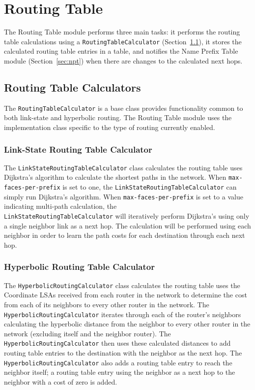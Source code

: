 \section{Routing Table}
\label{sec:routing-table}

The Routing Table module performs three main tasks: it performs the routing table calculations using a \texttt{RoutingTableCalculator} (Section~\ref{sec:routing-table-calculator}),
it stores the calculated routing table entries in a table, and notifies the Name Prefix Table module (Section~\ref{sec:npt}) when there are changes to the calculated next hops.

\subsection{Routing Table Calculators}
\label{sec:routing-table-calculator}

The \texttt{RoutingTableCalculator} is a base class provides functionality common to both link-state and hyperbolic routing.
The Routing Table module uses the implementation class specific to the type of routing currently enabled.

\subsubsection{Link-State Routing Table Calculator}

The \texttt{LinkStateRoutingTableCalculator} class calculates the routing table uses Dijkstra's algorithm to calculate the shortest paths in the network.
When \texttt{max-faces-per-prefix} is set to one, the \texttt{LinkStateRoutingTableCalculator} can simply run Dijkstra's algorithm.
When \texttt{max-faces-per-prefix} is set to a value indicating multi-path calculation, the \\ \texttt{LinkStateRoutingTableCalculator} will iteratively perform Dijkstra's using only a single neighbor link as a next hop.
The calculation will be performed using each neighbor in order to learn the path costs for each destination through each next hop.


\subsubsection{Hyperbolic Routing Table Calculator}

The \texttt{HyperbolicRoutingCalculator} class calculates the routing table uses the Coordinate LSAs received from each router in the network to determine the cost from each of its neighbors to every other router in the network.
The \texttt{HyperbolicRoutingCalculator} iterates through each of the router's neighbors calculating the hyperbolic distance from the neighbor to every other router in the network (excluding itself and the neighbor router).
The \texttt{HyperbolicRoutingCalculator} then uses these calculated distances to add routing table entries to the destination with the neighbor as the next hop.
The \texttt{HyperbolicRoutingCalculator} also adds a routing table entry to reach the neighbor itself; a routing table entry using the neighbor as a next hop to the neighbor with a cost of zero is added.

